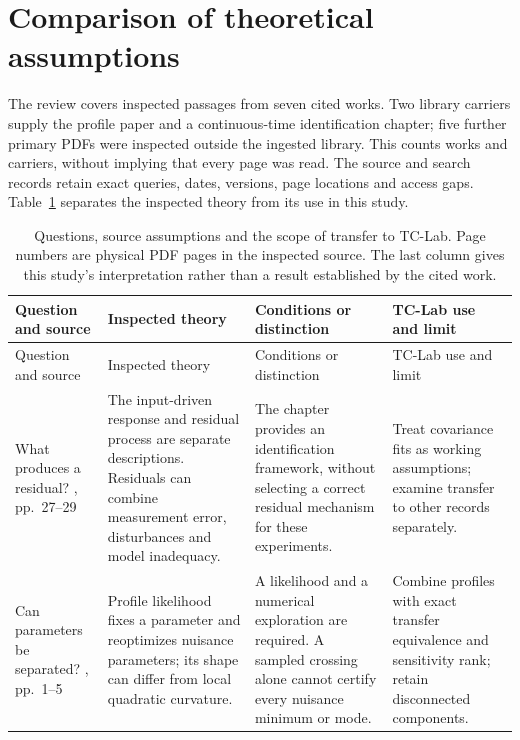 \section{Comparison of theoretical assumptions}
\label{sec:literature-comparison}
The review covers inspected passages from seven cited works. Two library
carriers supply the profile paper and a continuous-time identification chapter;
five further primary PDFs were inspected outside the ingested library. This
counts works and carriers, without implying that every page was read. The
source and search records retain exact queries, dates, versions, page locations
and access gaps. Table~\ref{tab:literature-comparison} separates the inspected
theory from its use in this study.

\begingroup
\small
\begin{longtable}{>{\raggedright\arraybackslash}p{.17\linewidth}>{\raggedright\arraybackslash}p{.25\linewidth}>{\raggedright\arraybackslash}p{.25\linewidth}>{\raggedright\arraybackslash}p{.19\linewidth}}
 \caption{Questions, source assumptions and the scope of transfer to TC-Lab.
 Page numbers are physical PDF pages in the inspected source. The last column
 gives this study's interpretation rather than a result established by the
 cited work.}\label{tab:literature-comparison}\\
 \toprule
 Question and source & Inspected theory & Conditions or distinction & TC-Lab use and limit \\
 \midrule
 \endfirsthead
 \toprule
 Question and source & Inspected theory & Conditions or distinction & TC-Lab use and limit \\
 \midrule
 \endhead
 \bottomrule
 \endfoot
 What produces a residual?\newline
 \citet{garnier-2008-direct}, pp.~27--29
 & The input-driven response and residual process are separate descriptions.
 Residuals can combine measurement error, disturbances and model inadequacy.
 & The chapter provides an identification framework, without selecting a
 correct residual mechanism for these experiments.
 & Treat covariance fits as working assumptions; examine transfer to other
 records separately. \\[.6em]

 Can parameters be separated?\newline
 \citet{raue-2009-structural}, pp.~1--5
 & Profile likelihood fixes a parameter and reoptimizes nuisance parameters;
 its shape can differ from local quadratic curvature.
 & A likelihood and a numerical exploration are required. A sampled crossing
 alone cannot certify every nuisance minimum or mode.
 & Combine profiles with exact transfer equivalence and sensitivity rank;
 retain disconnected components. \\[.6em]


\end{longtable}
